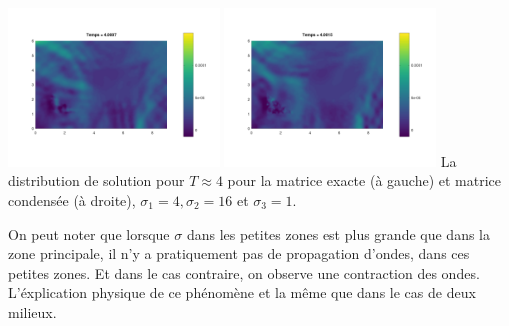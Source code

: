\documentclass[12pt]{article}
\begin{document}
\begin{center}
	\hspace{1cm}\includegraphics[width=0.42\textwidth]{images/u_trois_mil_4_16_1}\hspace{1cm}
	\includegraphics[width=0.42\textwidth]{images/u_trois_mil_4_16_1_cond}\hspace{1cm}
	{La distribution de solution pour $T \approx 4$ pour la matrice exacte (à gauche) et matrice condensée (à droite), $\sigma_1 = 4, \sigma_2 = 16$ et $\sigma_3 = 1$.}
\end{center}

On peut noter que lorsque $\sigma$ dans les petites zones est plus grande que dans la zone principale, il n'y a pratiquement pas de propagation d'ondes, dans ces petites zones.  Et dans le cas contraire, on observe une contraction des ondes. L'éxplication physique de ce phénomène et la même que dans le cas de deux milieux.
\end{document}
